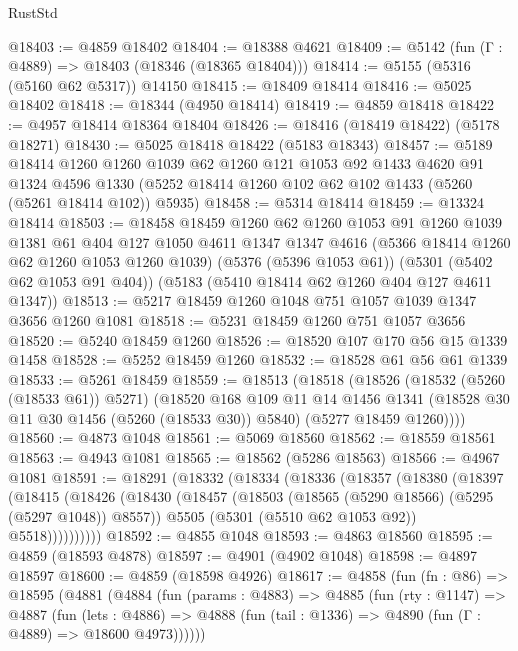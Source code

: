 \begin{lexlean}{RustStd}
\begin{coremodule}
@18403 := @4859 @18402
@18404 := @18388 @4621
@18409 := @5142 (fun (Γ : @4889) => @18403 (@18346 (@18365 @18404)))
@18414 := @5155 (@5316 (@5160 @62 @5317)) @14150
@18415 := @18409 @18414
@18416 := @5025 @18402
@18418 := @18344 (@4950 @18414)
@18419 := @4859 @18418
@18422 := @4957 @18414 @18364 @18404
@18426 := @18416 (@18419 @18422) (@5178 @18271)
@18430 := @5025 @18418 @18422 (@5183 @18343)
@18457 := @5189
    @18414
    @1260
    @1260
    @1039
    @62
    @1260
    @121
    @1053
    @92
    @1433
    @4620
    @91
    @1324
    @4596
    @1330
    (@5252 @18414 @1260 @102 @62 @102 @1433 (@5260 (@5261 @18414 @102)) @5935)
@18458 := @5314 @18414
@18459 := @13324 @18414
@18503 := @18458
    @18459
    @1260
    @62
    @1260
    @1053
    @91
    @1260
    @1039
    @1381
    @61
    @404
    @127
    @1050
    @4611
    @1347
    @1347
    @4616
    (@5366 @18414 @1260 @62 @1260 @1053 @1260 @1039)
    (@5376 (@5396 @1053 @61))
    (@5301 (@5402 @62 @1053 @91 @404))
    (@5183 (@5410 @18414 @62 @1260 @404 @127 @4611 @1347))
@18513 := @5217 @18459 @1260 @1048 @751 @1057 @1039 @1347 @3656 @1260 @1081
@18518 := @5231 @18459 @1260 @751 @1057 @3656
@18520 := @5240 @18459 @1260
@18526 := @18520 @107 @170 @56 @15 @1339 @1458
@18528 := @5252 @18459 @1260
@18532 := @18528 @61 @56 @61 @1339
@18533 := @5261 @18459
@18559 := @18513
    (@18518
      (@18526
        (@18532 (@5260 (@18533 @61)) @5271)
        (@18520
          @168
          @109
          @11
          @14
          @1456
          @1341
          (@18528 @30 @11 @30 @1456 (@5260 (@18533 @30)) @5840)
          (@5277 @18459 @1260))))
@18560 := @4873 @1048
@18561 := @5069 @18560
@18562 := @18559 @18561
@18563 := @4943 @1081
@18565 := @18562 (@5286 @18563)
@18566 := @4967 @1081
@18591 := @18291
    (@18332
      (@18334
        (@18336
          (@18357
            (@18380
              (@18397
                (@18415
                  (@18426
                    (@18430
                      (@18457
                        (@18503 (@18565 (@5290 @18566) (@5295 (@5297 @1048)) @8557))
                        @5505
                        (@5301 (@5510 @62 @1053 @92))
                        @5518))))))))))
@18592 := @4855 @1048
@18593 := @4863 @18560
@18595 := @4859 (@18593 @4878)
@18597 := @4901 (@4902 @1048)
@18598 := @4897 @18597
@18600 := @4859 (@18598 @4926)
@18617 := @4858
    (fun (fn : @86) =>
    @18595
      (@4881
        (@4884
          (fun (params : @4883) =>
          @4885
            (fun (rty : @1147) =>
            @4887
              (fun (lets : @4886) =>
              @4888 (fun (tail : @1336) => @4890 (fun (Γ : @4889) => @18600 @4973))))))

\end{coremodule}
\end{lexlean}

